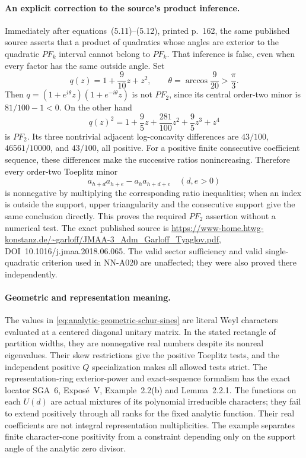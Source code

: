 \paragraph{An explicit correction to the source's product inference.}
Immediately after equations~(5.11)--(5.12), printed p.~162,
the same published source asserts that a product of quadratics
whose angles are exterior to the quadratic $PF_k$ interval
cannot belong to $PF_k$. That inference is false, even when
every factor has the same outside angle. Set
\[
 q(z)=1+\frac9{10}z+z^2,\qquad
 \theta=\arccos\frac9{20}>\frac\pi3.
\]
Then $q=(1+e^{i\theta}z)(1+e^{-i\theta}z)$ is not $PF_2$,
since its central order-two minor is $81/100-1<0$.
On the other hand
\[
 q(z)^2=1+\frac95z+\frac{281}{100}z^2+\frac95z^3+z^4
\]
is $PF_2$. Its three nontrivial adjacent log-concavity
differences are $43/100$, $46561/10000$, and $43/100$,
all positive. For a positive finite consecutive coefficient
sequence, these differences make the successive ratios
nonincreasing. Therefore every order-two Toeplitz minor
\[
       a_{h+d}a_{h+e}-a_ha_{h+d+e}\quad(d,e>0)
\]
is nonnegative by multiplying the corresponding ratio
inequalities; when an index is outside the support,
upper triangularity and the consecutive support give the
same conclusion directly. This proves the required $PF_2$
assertion without a numerical test. The exact published
source is
\url{https://www-home.htwg-konstanz.de/~garloff/JMAA-3_Adm_Garloff_Tyaglov.pdf},
DOI~10.1016/j.jmaa.2018.06.065. The valid sector sufficiency
and valid single-quadratic criterion used in NN-A020 are
unaffected; they were also proved there independently.

\paragraph{Geometric and representation meaning.}
The values in \eqref{eq:analytic-geometric-schur-sines} are
literal Weyl characters evaluated at a centered diagonal
unitary matrix. In the stated rectangle of partition widths,
they are nonnegative real numbers despite its nonreal
eigenvalues. Their skew restrictions give the positive
Toeplitz tests, and the independent positive $Q$ specialization
makes all allowed tests strict. The representation-ring
exterior-power and exact-sequence formalism has the exact
locator SGA~6, Expos\'e~V, Example~2.2(b) and Lemma~2.2.1.
The functions on each $U(d)$ are actual mixtures of its
polynomial irreducible characters; they fail to extend
positively through all ranks for the fixed analytic function.
Their real coefficients are not integral representation
multiplicities. The example separates finite character-cone
positivity from a constraint depending only on the support
angle of the analytic zero divisor.


